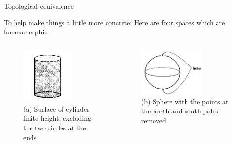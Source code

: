 \documentclass{beamer}
\begin{document}
\begin{frame}{Topological equivalence}
  \begin{block}{}
    To help make things a little more concrete: Here are four spaces which are homeomorphic.
  \end{block}
  \begin{columns}
    \begin{column}{0.4\textwidth}
      \begin{figure}
        \centering
        \includegraphics[width=0.7\textwidth]{figure_1_9_a.png}
        \caption{(a) Surface of cylinder finite height, excluding the two circles at the ends}
      \end{figure}
    \end{column}
    \begin{column}{0.6\textwidth}
      \begin{figure}
        \centering
        \includegraphics[width=0.7\textwidth]{figure_1_9_d.png}
        \caption{(b) Sphere with the points at the north and south poles removed}
      \end{figure}
    \end{column}
  \end{columns}
\end{frame}
\end{document}
